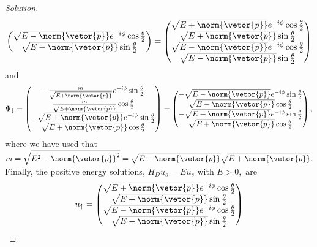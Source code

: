 \begin{proof}[Solution]
\begin{equation*}
\begin{pmatrix}
         \sqrt{E - \norm{\vetor{p}}}e^{-i\phi} \cos\frac\theta2\\
         \sqrt{E - \norm{\vetor{p}}}\sin\frac\theta2
      \end{pmatrix}
      =
      \begin{pmatrix}
         \sqrt{E + \norm{\vetor{p}}} e^{-i\phi} \cos\frac\theta2\\
         \sqrt{E + \norm{\vetor{p}}} \sin\frac\theta2\\
         \sqrt{E - \norm{\vetor{p}}}e^{-i\phi} \cos\frac\theta2\\
         \sqrt{E - \norm{\vetor{p}}}\sin\frac\theta2
      \end{pmatrix}
   \end{equation*}
   and
   \begin{equation*}
      \Psi_\downarrow =  \begin{pmatrix}
         -\frac{m}{\sqrt{E + \norm{\vetor{p}}}} e^{-i\phi} \sin\frac\theta2\\
         \frac{m}{\sqrt{E + \norm{\vetor{p}}}} \cos\frac\theta2\\
         -\sqrt{E + \norm{\vetor{p}}}e^{-i\phi} \sin\frac\theta2\\
         \sqrt{E + \norm{\vetor{p}}}\cos\frac\theta2
      \end{pmatrix}
      =
      \begin{pmatrix}
         -\sqrt{E - \norm{\vetor{p}}} e^{-i\phi} \sin\frac\theta2\\
         \sqrt{E - \norm{\vetor{p}}} \cos\frac\theta2\\
         -\sqrt{E + \norm{\vetor{p}}}e^{-i\phi} \sin\frac\theta2\\
         \sqrt{E + \norm{\vetor{p}}}\cos\frac\theta2
      \end{pmatrix},
   \end{equation*}
   where we have used that \(m = \sqrt{E^2 - \norm{\vetor{p}}^2} = \sqrt{E - \norm{\vetor{p}}} \sqrt{E + \norm{\vetor{p}}}.\) Finally, the positive energy solutions, \(H_D u_s = E u_s\) with \(E > 0,\) are
   \begin{equation*}
      u_\uparrow = \begin{pmatrix}
         \sqrt{E + \norm{\vetor{p}}} e^{-i\phi} \cos\frac\theta2\\
         \sqrt{E + \norm{\vetor{p}}} \sin\frac\theta2\\
         \sqrt{E - \norm{\vetor{p}}}e^{-i\phi} \cos\frac\theta2\\
         \sqrt{E - \norm{\vetor{p}}}\sin\frac\theta2

\end{pmatrix}
\end{equation*}
\end{proof}
